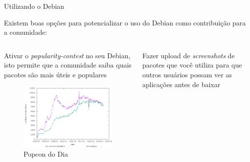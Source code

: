 \documentclass[10pt, compress, aspectratio=169]{beamer}
\begin{document}
\begin{frame}{Utilizando o Debian}

  Existem boas opções para potencializar o uso do Debian como contribuição
  para a comunidade:

  \begin{columns}[T]
    \begin{column}{.4\textwidth}

    Ativar o \textit{popularity-contest} no seu Debian, isto permite que a
    comunidade saiba quais pacotes são mais úteis e populares

      \begin{figure}
        \centering
        \includegraphics[width=\linewidth,
                       height=0.4\textheight,
                       keepaspectratio]{popcon_dia}
      \caption{Popcon do Dia}
      \end{figure}

      \pause

    \end{column}

    \hfill
    \begin{column}{.5\textwidth}

      Fazer upload de \textit{screenshots} de pacotes que você utiliza para
      que outros usuários possam ver as aplicações antes de baixar


\end{column}
\end{columns}
\end{frame}
\end{document}
